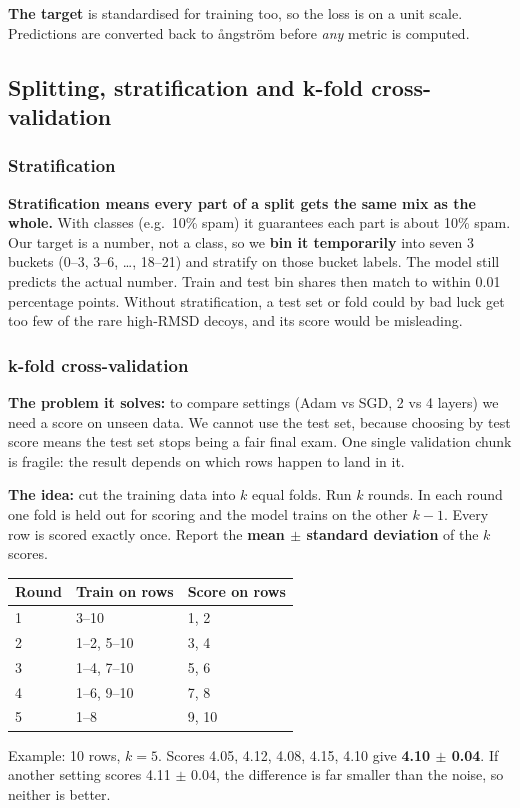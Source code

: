 \documentclass[11pt,a4paper]{article}
\newcommand{\A}{\,\text{\AA}}
\begin{document}
\textbf{The target} is standardised for training too, so the loss is on a unit scale. Predictions are converted back
to ångström before \emph{any} metric is computed.

\subsection{Splitting, stratification and k-fold cross-validation}

\subsubsection*{Stratification}
\textbf{Stratification means every part of a split gets the same mix as the whole.} With classes (e.g.\ 10\% spam) it
guarantees each part is about 10\% spam. Our target is a number, not a class, so we \textbf{bin it temporarily} into
seven 3\A{} buckets (0--3, 3--6, \ldots, 18--21) and stratify on those bucket labels. The model still predicts the
actual number. Train and test bin shares then match to within 0.01 percentage points. Without stratification, a test
set or fold could by bad luck get too few of the rare high-RMSD decoys, and its score would be misleading.

\subsubsection*{k-fold cross-validation}
\textbf{The problem it solves:} to compare settings (Adam vs SGD, 2 vs 4 layers) we need a score on unseen data. We
cannot use the test set, because choosing by test score means the test set stops being a fair final exam. One single
validation chunk is fragile: the result depends on which rows happen to land in it.

\textbf{The idea:} cut the training data into $k$ equal folds. Run $k$ rounds. In each round one fold is held out for
scoring and the model trains on the other $k-1$. Every row is scored exactly once. Report the \textbf{mean $\pm$
standard deviation} of the $k$ scores.

\begin{center}
\small
\begin{tabular}{@{}lll@{}}
\toprule
Round & Train on rows & Score on rows \\
\midrule
1 & 3--10 & 1, 2 \\
2 & 1--2, 5--10 & 3, 4 \\
3 & 1--4, 7--10 & 5, 6 \\
4 & 1--6, 9--10 & 7, 8 \\
5 & 1--8 & 9, 10 \\
\bottomrule
\end{tabular}
\quad
\begin{minipage}{0.45\linewidth}
Example: 10 rows, $k = 5$. Scores 4.05, 4.12, 4.08, 4.15, 4.10 give \textbf{4.10 $\pm$ 0.04}. If another setting scores
4.11 $\pm$ 0.04, the difference is far smaller than the noise, so neither is better.
\end{minipage}
\end{center}
\end{document}
